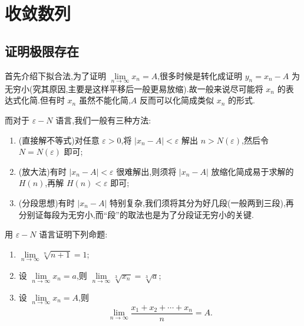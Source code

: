 \newpage

\section{收敛数列}


\subsection{证明极限存在}



首先介绍下拟合法,为了证明 $\displaystyle \lim\limits_{n\to\infty}x_n=A$,很多时候是转化成证明
$y_n=x_n-A$ 为无穷小(究其原因,主要是这样平移后一般更易放缩).故一般来说尽可能将
$x_n$ 的表达式化简.但有时 $x_n$ 虽然不能化简,$A$ 反而可以化简成类似 $x_n$ 的形式.

而对于 $\varepsilon-N$ 语言,我们一般有三种方法:

\begin{enumerate}
  \item (直接解不等式)对任意 $\varepsilon>0$,将 $|x_n-A|<\varepsilon$ 解出
        $n>N(\varepsilon)$,然后令 $N=N(\varepsilon)$ 即可;
  \item (放大法)有时 $|x_n-A|<\varepsilon$ 很难解出,则须将 $|x_n-A|$ 放缩化简成易于求解的
        $H(n)$,再解 $H(n)<\varepsilon$ 即可;
  \item (分段思想)有时 $|x_n-A|$ 特别复杂,我们须将其分为好几段(一般两到三段),再分别证每段为无穷小,而``段''的取法也是为了分段证无穷小的关键.
\end{enumerate}

\begin{example}
  用 $\varepsilon-N$ 语言证明下列命题:
  \begin{enumerate}
    \item $\displaystyle \lim\limits_{n\to\infty}\sqrt[n]{n+1}=1$;
    \item 设 $\displaystyle \lim\limits_{n\to\infty}x_n=a$,则
          $\displaystyle \lim\limits_{n\to\infty}\sqrt[3]{x_n}=\sqrt[3]{a}$;
    \item 设 $\displaystyle \lim\limits_{n\to\infty}x_n=A$,则
          \[
            \lim\limits_{n\to\infty}\dfrac{x_1+x_2+\cdots+x_n}{n}=A.
          \]
  \end{enumerate}
\end{example}
\exampleblank


